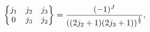 \[\begin{Bmatrix}j_{1}&j_{2}&j_{3}\\
0&j_{3}&j_{2}\end{Bmatrix}=\frac{(-1)^{J}}{\left((2j_{2}+1)(2j_{3}+1)\right)^{%
\frac{1}{2}}},\]